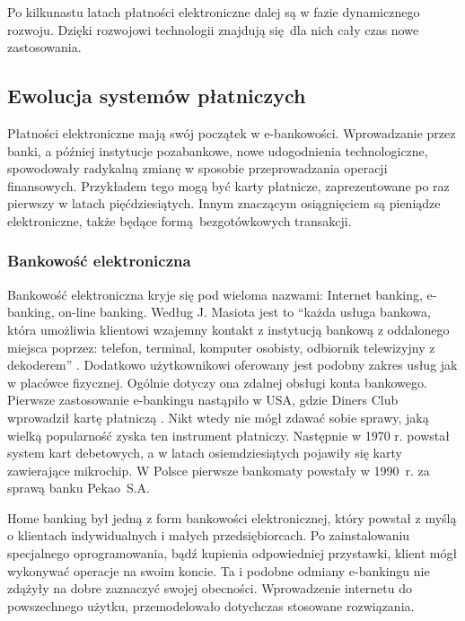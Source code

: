 Po kilkunastu latach płatności elektroniczne dalej są w fazie dynamicznego rozwoju. Dzięki rozwojowi technologii znajdują się dla nich cały czas nowe zastosowania. 


\subsection{Ewolucja systemów płatniczych}

Płatności elektroniczne mają swój początek w e-bankowości. Wprowadzanie przez banki, a później instytucje pozabankowe, nowe udogodnienia technologiczne, spowodowały radykalną zmianę w sposobie przeprowadzania operacji finansowych. Przykładem tego mogą być karty płatnicze, zaprezentowane po raz pierwszy w latach pięćdziesiątych. Innym znaczącym osiągnięciem są pieniądze elektroniczne, także będące formą bezgotówkowych transakcji. 

\subsubsection*{Bankowość elektroniczna}

Bankowość elektroniczna kryje się pod wieloma nazwami: Internet banking, e-banking, on-line banking. Według J. Masiota jest to ``każda usługa bankowa, która umożliwia klientowi wzajemny kontakt z instytucją bankową z oddalonego miejsca poprzez: telefon, terminal, komputer osobisty, odbiornik telewizyjny z dekoderem'' \cite{pieniadz_elektroniczny-analiza}. Dodatkowo użytkownikowi oferowany jest podobny zakres usług jak w placówce fizycznej. Ogólnie dotyczy ona zdalnej obsługi konta bankowego. Pierwsze zastosowanie e-bankingu nastąpiło w USA, gdzie Diners Club wprowadził kartę płatniczą \cite{pieniadz_elektroniczny-analiza}. Nikt wtedy nie mógł zdawać sobie sprawy, jaką wielką popularność zyska ten instrument płatniczy. Następnie w 1970 r. powstał system kart debetowych, a w latach osiemdziesiątych pojawiły się  karty zawierające mikrochip. W Polsce pierwsze bankomaty powstały w 1990~r. za sprawą banku Pekao~S.A.

Home banking był jedną z form bankowości elektronicznej, który powstał z myślą o klientach indywidualnych i małych przedsiębiorcach. Po zainstalowaniu specjalnego oprogramowania, bądź kupienia odpowiedniej przystawki, klient mógł wykonywać operacje na swoim koncie. Ta i podobne odmiany e-bankingu nie zdążyły na dobre zaznaczyć swojej obecności. Wprowadzenie internetu do powszechnego użytku, przemodelowało dotychczas stosowane rozwiązania.

